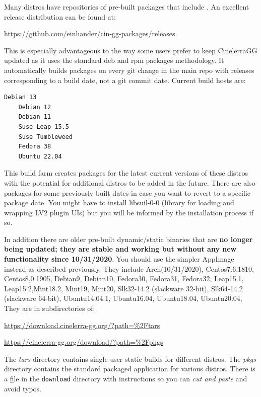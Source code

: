 Many distros have repositories of pre-built packages that include \CGG{}.
An excellent release distribution can be found at: 

   \url{https://github.com/einhander/cin-gg-packages/releases}.

This is especially advantageous to the way some users prefer to keep CinelerraGG
updated as it uses the standard deb and rpm packages methodology.
It automatically builds packages on every git change in the main repo with  
releases corresponding to a build date, not a git commit date.
Current build hosts are:

\begin{lstlisting}[style=sh]
	Debian 13 
	Debian 12 
	Debian 11 
	Suse Leap 15.5
	Suse Tumbleweed 
	Fedora 38
	Ubuntu 22.04
\end{lstlisting}

This build farm creates packages for the latest current versions of these
distros with the potential for additional distros to be added in the future. 
There are also packages for some previously built dates
in case you want to revert to a specific package date.  You might have to 
install libsuil-0-0 (library for loading and wrapping LV2 plugin UIs) but
you will be informed by the installation process if so.

In addition there are older pre-built dynamic/static binaries that are
 \textbf{no longer being updated; they are stable and working but without any new functionality since 10/31/2020}.
You should use the simpler AppImage instead as described previously.
They include Arch(10/31/2020), Centos7.6.1810, Centos8,0.1905, Debian9, Debian10, Fedora30,
Fedora31, Fedora32, Leap15.1, Leap15.2,Mint18.2, Mint19, Mint20, Slk32-14.2 (slackware 32-bit), 
Slk64-14.2 (slackware 64-bit), Ubuntu14.04.1, Ubuntu16.04, Ubuntu18.04, Ubuntu20.04,
They are in subdirectories of:
\begin{list}{}{}
	\item \href{https://download.cinelerra-gg.org/?path=\%2Ftars}{https://download.cinelerra-gg.org/?path=\%2Ftars}
	\item \href{https://download.cinelerra-gg.org/?path=\%2Fpkgs}{https://cinelerra-gg.org/download/?path=\%2Fpkgs}
\end{list}
The \textit{tars}  directory contains single-user static builds for
different distros.
%
The \textit{pkgs}  directory contains the standard packaged
application for various distros.  There is a
\href{https://download.cinelerra-gg.org/download.php?file=\%2FREADME.pkgs}
file in the \texttt{download} directory with instructions so you
can \textit{cut and paste} and avoid typos.

